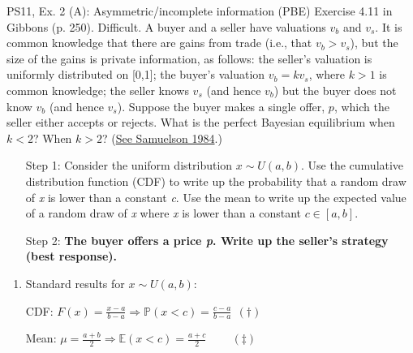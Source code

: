 \begin{frame}{PS11, Ex. 2 (A): Asymmetric/incomplete information (PBE)}
    Exercise 4.11 in Gibbons (p. 250). Difficult. A buyer and a seller have valuations $v_b$ and $v_s$. It is common knowledge that there are gains from trade (i.e., that $v_b > v_s$), but the size of the gains is private information, as follows: the seller’s valuation is uniformly distributed on [0,1]; the buyer’s valuation $v_b = kv_s$, where $k > 1$ is common knowledge; the seller knows $v_s$ (and hence $v_b$) but the buyer does not know $v_b$ (and hence $v_s$). Suppose the buyer makes a single offer, $p$, which the seller either accepts or rejects. What is the perfect Bayesian equilibrium when $k < 2$? When $k > 2$? (\href{https://www.jstor.org/stable/1911195}{See Samuelson 1984}.) \vspace{-8pt}
    \begin{multicols}{2}
      \begin{itemize}
        \item[Step 1:] Consider the uniform distribution $x\sim U(a, b)$. Use the cumulative distribution function (CDF) to write up the probability that a random draw of \textit{x} is lower than a constant \textit{c}. Use the mean to write up the expected value of a random draw of \textit{x} where \textit{x} is lower than a constant $c\in[a,b]$.
        \item[Step 2:] \textbf{The buyer offers a price \textit{p}. Write up the seller's strategy (best response).}
      \end{itemize}
      \vfill\null\columnbreak
      \begin{enumerate}
        \item Standard results for $x\sim U(a, b):$
        \item[CDF:] $F(x)=\frac{x-a}{b-a}\Rightarrow\mathbb{P}(x<c)=\frac{c-a}{b-a}\ \ (\dagger)$
        \item[Mean:] $\mu=\frac{a+b}{2}\Rightarrow\mathbb{E}(x<c)=\frac{a+c}{2}\quad\quad\ (\ddagger)$
      \end{enumerate}
      \vfill\null
    \end{multicols}
\end{frame}
